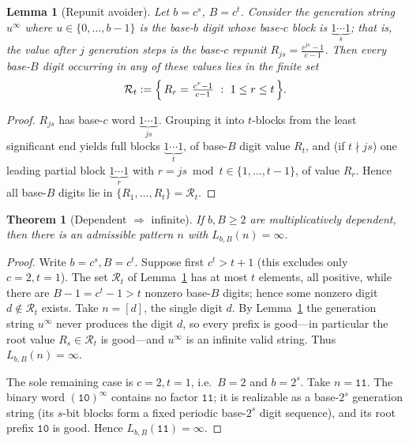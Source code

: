 \documentclass[a4paper]{article}
\theoremstyle{plain}
\newtheorem{theorem}{Theorem}[subsection]
\newtheorem{lemma}{Lemma}[subsection]
\theoremstyle{definition}
\theoremstyle{remark}
\newcommand{\Lbb}[1][b,B]{L_{#1}}
\begin{document}
\begin{lemma}[Repunit avoider]\label{av:lem:repunit}
Let $b=c^{s}$, $B=c^{t}$. Consider the generation string $u^{\infty}$ where $u\in\{0,\dots,b-1\}$ is the base-$b$ digit whose base-$c$ block is $\underbrace{1\cdots1}_{s}$; that is, the value after $j$ generation steps is the base-$c$ repunit $R_{js}=\frac{c^{js}-1}{c-1}$. Then every base-$B$ digit occurring in any of these values lies in the finite set
\[
\mathcal R_t:=\Bigl\{\,R_r=\tfrac{c^{r}-1}{c-1}\ :\ 1\le r\le t\,\Bigr\}.
\]
\end{lemma}

\begin{proof}
$R_{js}$ has base-$c$ word $\underbrace{1\cdots1}_{js}$. Grouping it into $t$-blocks from the least significant end yields full blocks $\underbrace{1\cdots1}_{t}$, of base-$B$ digit value $R_t$, and (if $t\nmid js$) one leading partial block $\underbrace{1\cdots1}_{r}$ with $r=js\bmod t\in\{1,\dots,t-1\}$, of value $R_r$. Hence all base-$B$ digits lie in $\{R_1,\dots,R_t\}=\mathcal R_t$.
\end{proof}

\begin{theorem}[Dependent $\Rightarrow$ infinite]\label{av:thm:dep}
If $b,B\ge2$ are multiplicatively dependent, then there is an admissible pattern $n$ with $\Lbb(n)=\infty$.
\end{theorem}

\begin{proof}
Write $b=c^{s},B=c^{t}$. Suppose first $c^{t}>t+1$ (this excludes only $c=2,t=1$). The set $\mathcal R_t$ of Lemma~\ref{av:lem:repunit} has at most $t$ elements, all positive, while there are $B-1=c^{t}-1>t$ nonzero base-$B$ digits; hence some nonzero digit $d\notin\mathcal R_t$ exists. Take $n=[d]$, the single digit $d$. By Lemma~\ref{av:lem:repunit} the generation string $u^{\infty}$ never produces the digit $d$, so every prefix is good---in particular the root value $R_s\in\mathcal R_t$ is good---and $u^{\infty}$ is an infinite valid string. Thus $\Lbb(n)=\infty$.

The sole remaining case is $c=2,t=1$, i.e.\ $B=2$ and $b=2^{s}$. Take $n=\texttt{11}$. The binary word $(\texttt{10})^{\infty}$ contains no factor $\texttt{11}$; it is realizable as a base-$2^{s}$ generation string (its $s$-bit blocks form a fixed periodic base-$2^{s}$ digit sequence), and its root prefix $\texttt{10}$ is good. Hence $\Lbb(\texttt{11})=\infty$.
\end{proof}
\end{document}

